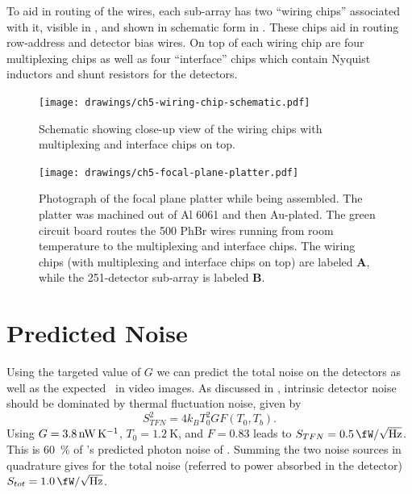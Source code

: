 To aid in routing of the wires, each sub-array has two ``wiring chips'' associated with it, visible in , and shown in schematic form in .
These chips aid in routing row-address and detector bias wires.
On top of each wiring chip are four multiplexing chips as well as four ``interface'' chips which contain Nyquist inductors and shunt resistors for the detectors.

\begin{figure}
\centering
\texttt{[image: drawings/ch5-wiring-chip-schematic.pdf]}
\caption[Wiring chip schematic]{
  Schematic showing close-up view of the wiring chips with multiplexing and interface chips on top.
}
\label{fig:ch5-wiring-chip-schematic}
\end{figure}

\begin{figure}
\centering
\texttt{[image: drawings/ch5-focal-plane-platter.pdf]}
\caption[Focal plane during assembly]{
  Photograph of the focal plane platter while being assembled.
  The platter was machined out of Al 6061 and then Au-plated.
  The green circuit board routes the 500 PhBr wires running from room temperature to the multiplexing and interface chips.
  The wiring chips (with multiplexing and interface chips on top) are labeled \textbf{A}, while the 251-detector sub-array is labeled \textbf{B}.
}
\label{fig:ch5-focal-plane-platter}
\end{figure}

\section{Predicted Noise} \label{sec:ch5-predicted-noise}

Using the targeted value of $G$ we can predict the total noise on the detectors as well as the expected \NETD\ in video images.
As discussed in , intrinsic detector noise should be dominated by thermal fluctuation noise, given by
\begin{equation}
  S^2_{TFN} = 4 k_B T_0^2 G F(T_0, T_b).
\end{equation}
Using $G = \SI{3.8}{\nW\per\K}$, $T_0 = \SI{1.2}{\K}$, and $F = 0.83$ leads to $S_{TFN} = \Pnoisef{0.5}$.
This is \SI{60}{\percent} of 's predicted photon noise of .
Summing the two noise sources in quadrature gives for the total noise (referred to power absorbed in the detector) $S_{tot} = \Pnoisef{1.0}$.

